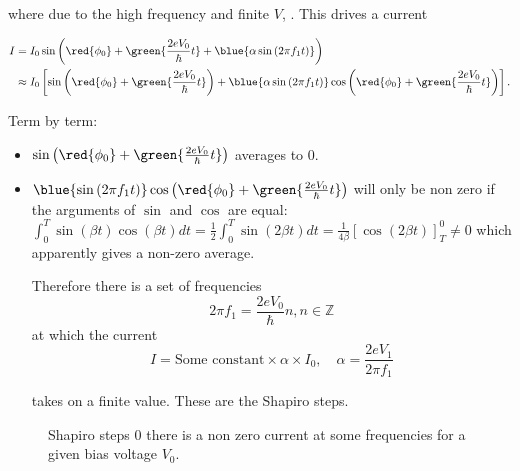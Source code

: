 \noindent  where   due  to  the   high  frequency  and   finite  $V$,
.   This drives  a
current

\begin{equation}
  \begin{aligned}
    I & = I_0\sin\left(\red{\phi_0} + \green{\frac{2eV_0}{\hbar}t} +
      \blue{\alpha\sin\left( 2\pi f_1 t \right)} \right) \\
    &     \approx     I_0     \left[     \sin\left(\red{\phi_0}     +
        \green{\frac{2eV_0}{\hbar}t}\right)  + \blue{\alpha\sin\left(
          2\pi    f_1    t    \right)}\cos    \left(\red{\phi_0}    +
        \green{\frac{2eV_0}{\hbar}t} \right) \right].
  \end{aligned}
\end{equation}

\noindent Term by term:

\begin{itemize}
\item $\sin\left(\red{\phi_0}  + \green{\frac{2eV_0}{\hbar}t}\right)$
  averages to 0.
\item
  $\blue{\sin\left(  2\pi  f_1  t \right)}\cos  \left(\red{\phi_0}  +
    \green{\frac{2eV_0}{\hbar}t} \right)$  will only  be non  zero if
  the    arguments    of    $\sin$     and    $\cos$    are    equal:
  $\int_0^T\sin(\beta          t)\cos(\beta           t)dt          =
  \frac{1}{2}\int_0^{T}\sin(2\beta   t)dt  =   \frac{1}{4\beta}\left[
    \cos(2\beta  t) \right]_T^0  \ne  0 $  which  apparently gives  a
  non-zero average.

  \begin{framed}\noindent
    Therefore there is a set of frequencies
    \begin{equation}
      2\pi f_{1} = \frac{2eV_{0}}{\hbar}n, n \in \mathbb{Z}
    \end{equation}
    at which the current
    \begin{equation}
      I = \text{Some constant} \times \alpha \times I_0, \quad \alpha = \frac{2eV_{1}}{2\pi  f_1}
    \end{equation}

    \noindent takes on a finite value. These are the Shapiro steps.
  \end{framed}
\end{itemize}

\begin{figure}[h]
  \centering {}
  \caption{\small Shapiro steps 0 there is a non zero current at some
    frequencies       for       a      given       bias       voltage
    $V_0$. \label{fig:jj_shapiro_step_at_frequency}}
\end{figure}


